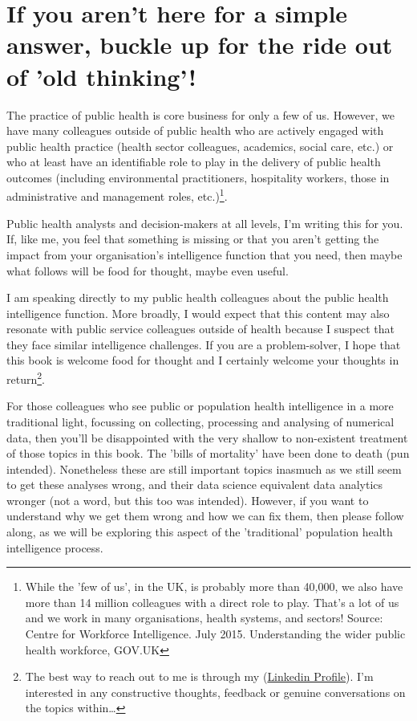 \section{If you aren't here for a simple answer, buckle up for the ride out of 'old thinking'!}

The practice of public health is core business for only a few of us. However, we have many colleagues outside of public health who are actively engaged with public health practice (health sector colleagues, academics, social care, etc.) or who at least have an identifiable role to play in the delivery of public health outcomes (including environmental practitioners, hospitality workers, those in administrative and management roles, etc.)\footnote{While the 'few of us', in the UK, is probably more than 40,000, we also have more than 14 million colleagues with a direct role to play. That's a lot of us and we work in many organisations, health systems, and sectors! Source: Centre for Workforce Intelligence. July 2015. Understanding the wider public health workforce, GOV.UK}.

Public health analysts and decision-makers at all levels, I'm writing this for you. If, like me, you feel that something is missing or that you aren't getting the impact from your organisation's intelligence function that you need, then maybe what follows will be food for thought, maybe even useful.

I am speaking directly to my public health colleagues about the public health intelligence function. More broadly, I would expect that this content may also resonate with public service colleagues outside of health because I suspect that they face similar intelligence challenges. If you are a problem-solver, I hope that this book is welcome food for thought and I certainly welcome your thoughts in return\footnote{The best way to reach out to me is through my (\href{https://www.linkedin.com/in/wchrrisskelly}{Linkedin Profile}). I'm interested in any constructive thoughts, feedback or genuine conversations on the topics within\ldots}.

For those colleagues who see public or population health intelligence in a more traditional light, focussing on collecting, processing and analysing of numerical data, then you'll be disappointed with the very shallow to non-existent treatment of those topics in this book. The 'bills of mortality' have been done to death (pun intended). Nonetheless these are still important topics inasmuch as we still seem to get these analyses wrong, and their data science equivalent data analytics wronger (not a word, but this too was intended). However, if you want to understand why we get them wrong and how we can fix them, then please follow along, as we will be exploring this aspect of the 'traditional' population health intelligence process.



